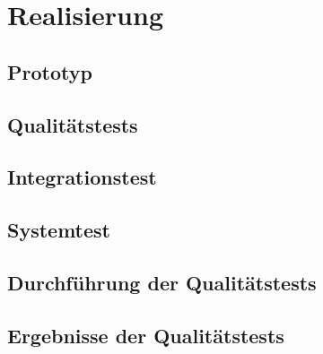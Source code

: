 \chapter{Realisierung}

\section{Prototyp}

\section{Qualitätstests}

\section{Integrationstest}

\section{Systemtest}

\section{Durchführung der Qualitätstests}

\section{Ergebnisse der Qualitätstests}
